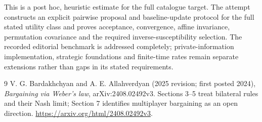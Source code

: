 \documentclass[11pt]{article}
\theoremstyle{remark}\newtheorem{remark}[theorem]{Remark}
\begin{document}
This is a post hoc, heuristic estimate for the full catalogue target.
The attempt constructs an explicit pairwise proposal and baseline-update protocol for the full stated utility class and proves acceptance, convergence, affine invariance, permutation covariance and the required inverse-susceptibility selection. The recorded editorial benchmark is addressed completely; private-information implementation, strategic foundations and finite-time rates remain separate extensions rather than gaps in its stated requirements.

\begin{thebibliography}{9}
 V. G. Bardakhchyan and A. E. Allahverdyan (2025 revision; first posted 2024), \emph{Bargaining via Weber's law}, arXiv:2408.02492v3. Sections 3--5 treat bilateral rules and their Nash limit; Section 7 identifies multiplayer bargaining as an open direction. \url{https://arxiv.org/html/2408.02492v3}.
\end{thebibliography}
\end{document}
